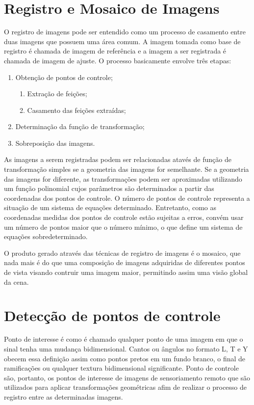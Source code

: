 \documentclass[9pt, a4paper, nofonttune, journal]{IEEEtran}
\begin{document}
\section{Registro e Mosaico de Imagens}
O registro de imagens pode ser entendido como um processo de casamento entre duas imagens que possuem uma área comum.
A imagem tomada como base de registro é chamada de imagem de referência e a imagem a ser registrada é chamada de imagem de ajuste.
O processo basicamente envolve três etapas:
\begin{enumerate}
	\item Obtenção de pontos de controle;
	\begin{enumerate}
		\item Extração de feições;
		\item Casamento das feições extraídas;
	\end{enumerate}
	\item Determinação da função de transformação;
	\item Sobreposição das imagens.
\end{enumerate}

As imagens a serem registradas podem ser relacionadas atavés de função de transformação simples se a geometria das imagens for semelhante.
Se a geometria das imagens for diferente, as transformações podem ser aproximadas utilizando um função polinomial cujos parâmetros são determinados 
a partir das coordenadas dos pontos de controle.
O número de pontos de controle representa a situação de um sistema de equações determinado.
Entretanto, como as coordenadas medidas dos pontos de controle estão sujeitas a erros, convém usar um número de pontos maior que o número mínimo,
o que define um sistema de equações sobredeterminado.

O produto gerado através das técnicas de registro de imagens é o mosaico, que nada mais é do que uma 
composição de imagens adquiridas de diferentes pontos de vista visando contruir uma imagem maior, permitindo assim uma visão global da cena.\cite{Fedorov1}


\section{Detecção de pontos de controle}
Ponto de interesse é como é chamado qualquer ponto de uma imagem em que o sinal tenha uma mudança bidimensional. Cantos ou ângulos
no formato L, T e Y obecem essa definição assim como pontos pretos em um fundo branco, o final de ramificações ou qualquer textura bidimensional
significante.\cite{Coderlia1}
Ponto de controle são, portanto, os pontos de interesse de imagens de sensoriamento remoto que são utilizados para aplicar transformações geométricas
afim de realizar o processo de registro entre as determinadas imagens.\cite{Schowengerdt}
\end{document}
